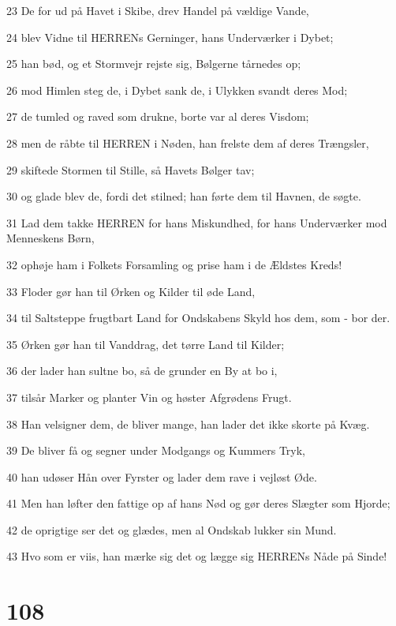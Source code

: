 \par 23 De for ud på Havet i Skibe, drev Handel på vældige Vande,
\par 24 blev Vidne til HERRENs Gerninger, hans Underværker i Dybet;
\par 25 han bød, og et Stormvejr rejste sig, Bølgerne tårnedes op;
\par 26 mod Himlen steg de, i Dybet sank de, i Ulykken svandt deres Mod;
\par 27 de tumled og raved som drukne, borte var al deres Visdom;
\par 28 men de råbte til HERREN i Nøden, han frelste dem af deres Trængsler,
\par 29 skiftede Stormen til Stille, så Havets Bølger tav;
\par 30 og glade blev de, fordi det stilned; han førte dem til Havnen, de søgte.
\par 31 Lad dem takke HERREN for hans Miskundhed, for hans Underværker mod Menneskens Børn,
\par 32 ophøje ham i Folkets Forsamling og prise ham i de Ældstes Kreds!
\par 33 Floder gør han til Ørken og Kilder til øde Land,
\par 34 til Saltsteppe frugtbart Land for Ondskabens Skyld hos dem, som - bor der.
\par 35 Ørken gør han til Vanddrag, det tørre Land til Kilder;
\par 36 der lader han sultne bo, så de grunder en By at bo i,
\par 37 tilsår Marker og planter Vin og høster Afgrødens Frugt.
\par 38 Han velsigner dem, de bliver mange, han lader det ikke skorte på Kvæg.
\par 39 De bliver få og segner under Modgangs og Kummers Tryk,
\par 40 han udøser Hån over Fyrster og lader dem rave i vejløst Øde.
\par 41 Men han løfter den fattige op af hans Nød og gør deres Slægter som Hjorde;
\par 42 de oprigtige ser det og glædes, men al Ondskab lukker sin Mund.
\par 43 Hvo som er viis, han mærke sig det og lægge sig HERRENs Nåde på Sinde!

\chapter{108}

